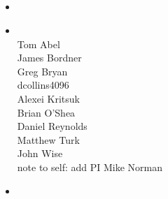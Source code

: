 \NEWSEC

\subsection{\ssSource}

\begin{frame}[fragile,label=ss-source] 
\secframetitle{\ssSource}
\begin{itemize}
\item {}
\item {} \\
\footnotesize
Tom Abel \\
 James Bordner \\ 
Greg Bryan \\
dcollins4096 \\ 
Alexei Kritsuk \\ 
Brian O'Shea \\
Daniel Reynolds \\ 
Matthew Turk \\ 
John Wise \\
\tiny{note to self: add PI Mike Norman} \\
\normalsize
\item {}  \\
\small{}
\end{itemize}
\end{frame}

